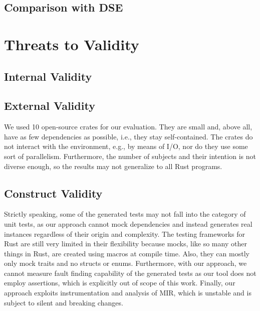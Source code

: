 \documentclass[paper=a4,%
  twoside,%
  BCOR4mm,%
  abstract=true,%
  toc=bibliography,%
  chapterprefix=true,%
  toc=bibliographynumbered,%
  open=right,%
  english,%
  pagesize=pdftex]{scrreprt}
\newcommand{\benchnum}{10\xspace}
\newcommand{\mir}{\ac{MIR}\xspace}
\begin{document}
\subsection{Comparison with DSE}

\section{Threats to Validity}
\label{sec:threats-to-validity}
\subsection*{Internal Validity}

\subsection*{External Validity}
We used \benchnum open-source crates for our evaluation. They are small and, above all, have as few dependencies as possible, i.e., they stay self-contained. The crates do not interact with the environment, e.g., by means of I/O, nor do they use some sort of parallelism. Furthermore, the number of subjects and their intention is not diverse enough, so the results may not generalize to all Rust programs.

\subsection*{Construct Validity}
Strictly speaking, some of the generated tests may not fall into the category of unit tests, as our approach cannot mock dependencies and instead generates real instances regardless of their origin and complexity. The testing frameworks for Rust are still very limited in their flexibility because mocks, like so many other things in Rust, are created using macros at compile time. Also, they can mostly only mock traits and no structs or enums. Furthermore, with our approach, we cannot measure fault finding capability of the generated tests as our tool does not employ assertions, which is explicitly out of scope of this work. Finally, our approach exploits instrumentation and analysis of \mir, which is unstable and is subject to silent and breaking changes. 

\end{document}
